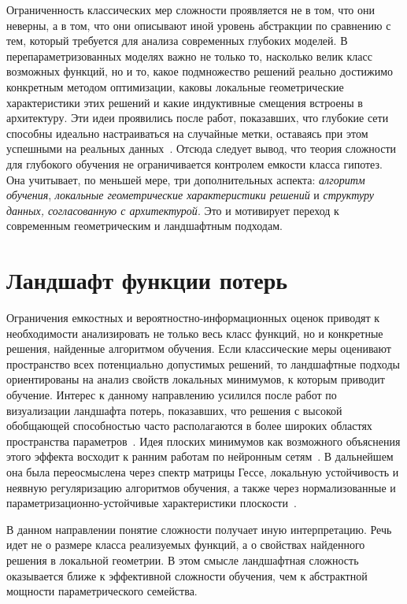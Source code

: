 Ограниченность классических мер сложности проявляется не в том, что они неверны, а в том, что они описывают иной уровень абстракции по сравнению с тем, который требуется для анализа современных глубоких моделей.
В перепараметризованных моделях важно не только то, насколько велик класс возможных функций, но и то, какое подмножество решений реально достижимо конкретным методом оптимизации, каковы локальные геометрические характеристики этих решений и какие индуктивные смещения встроены в архитектуру.
Эти идеи проявились после работ, показавших, что глубокие сети способны идеально настраиваться на случайные метки, оставаясь при этом успешными на реальных данных~\cite{zhang2021rethinking}.
Отсюда следует вывод, что теория сложности для глубокого обучения не ограничивается контролем емкости класса гипотез. Она учитывает, по меньшей мере, три дополнительных аспекта: \textit{алгоритм обучения}, \textit{локальные геометрические характеристики решений} и \textit{структуру данных, согласованную с архитектурой}.
Это и мотивирует переход к современным геометрическим и ландшафтным подходам.

\section{Ландшафт функции потерь}

Ограничения емкостных и вероятностно-информационных оценок приводят к необходимости анализировать не только весь класс функций, но и конкретные решения, найденные алгоритмом обучения.
Если классические меры оценивают пространство всех потенциально допустимых решений, то ландшафтные подходы ориентированы на анализ свойств локальных минимумов, к которым приводит обучение.
Интерес к данному направлению усилился после работ по визуализации ландшафта потерь, показавших, что решения с высокой обобщающей способностью часто располагаются в более широких областях пространства параметров~\cite{li2018visualizing,wu2017landscapes,landscape2017algorithms}.
Идея плоских минимумов как возможного объяснения этого эффекта восходит к ранним работам по нейронным сетям~\cite{hochreiter1997flat}.
В дальнейшем она была переосмыслена через спектр матрицы Гессе, локальную устойчивость и неявную регуляризацию алгоритмов обучения, а также через нормализованные и параметризационно-устойчивые характеристики плоскости~\cite{normalizedflat2019}.

В данном направлении понятие сложности получает иную интерпретацию. Речь идет не о размере класса реализуемых функций, а о свойствах найденного решения в локальной геометрии.
В этом смысле ландшафтная сложность оказывается ближе к эффективной сложности обучения, чем к абстрактной мощности параметрического семейства.

